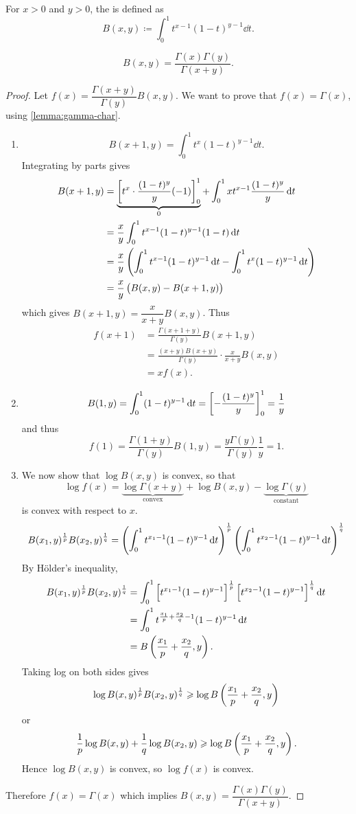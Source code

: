 \begin{definition}
For $x>0$ and $y>0$, the  is defined as
\[B(x,y)\coloneqq\int_0^1 t^{x-1}(1-t)^{y-1}\dd{t}.\]
\end{definition}

\begin{lemma}
\[B(x,y)=\frac{\Gamma(x)\Gamma(y)}{\Gamma(x+y)}.\]
\end{lemma}

\begin{proof}
Let $f(x)=\dfrac{\Gamma(x+y)}{\Gamma(y)}B(x,y)$. We want to prove that $f(x)=\Gamma(x)$, using \cref{lemma:gamma-char}.
\begin{enumerate}[label=(\roman*)]
\item \[B(x+1,y)=\int_0^1 t^x(1-t)^{y-1}\dd{t}.\]
Integrating by parts gives
\begin{align*}
B(x+1,y)&=\underbrace{\left[t^x\cdot\frac{(1-t)^y}{y}(-1)\right]_0^1}_{0}+\int_0^1 xt^{x-1}\frac{(1-t)^y}{y}\dd{t}\\
&=\frac{x}{y}\int_0^1 t^{x-1}(1-t)^{y-1}(1-t)\dd{t}\\
&=\frac{x}{y}\left(\int_0^1 t^{x-1}(1-t)^{y-1}\dd{t}-\int_0^1 t^x(1-t)^{y-1}\dd{t}\right)\\
&=\frac{x}{y}\left(B(x,y)-B(x+1,y)\right)
\end{align*}
which gives $B(x+1,y)=\dfrac{x}{x+y}B(x,y)$. Thus
\begin{align*}
f(x+1)&=\frac{\Gamma(x+1+y)}{\Gamma(y)}B(x+1,y)\\
&=\frac{(x+y)B(x+y)}{\Gamma(y)}\cdot\frac{x}{x+y}B(x,y)\\
&=xf(x).
\end{align*}
\item \[B(1,y)=\int_0^1(1-t)^{y-1}\dd{t}=\left[-\frac{(1-t)^y}{y}\right]_0^1=\frac{1}{y}\]
and thus
\[f(1)=\frac{\Gamma(1+y)}{\Gamma(y)}B(1,y)=\frac{y\Gamma(y)}{\Gamma(y)}\frac{1}{y}=1.\]
\item We now show that $\log B(x,y)$ is convex, so that
\[\log f(x)=\underbrace{\log\Gamma(x+y)}_\text{convex}+\log B(x,y)-\underbrace{\log\Gamma(y)}_\text{constant}\]
is convex with respect to $x$.
\[B(x_1,y)^\frac{1}{p}B(x_2,y)^\frac{1}{q}=\left(\int_0^1 t^{x_1-1}(1-t)^{y-1}\dd{t}\right)^\frac{1}{p}\left(\int_0^1 t^{x_2-1}(1-t)^{y-1}\dd{t}\right)^\frac{1}{q}\]
By H\"{o}lder's inequality,
\begin{align*}
B(x_1,y)^\frac{1}{p}B(x_2,y)^\frac{1}{q}
&=\int_0^1\left[t^{x_1-1}(1-t)^{y-1}\right]^\frac{1}{p}\left[t^{x_2-1}(1-t)^{y-1}\right]^\frac{1}{q}\dd{t}\\
&=\int_0^1 t^{\frac{x_1}{p}+\frac{x_2}{q}-1}(1-t)^{y-1}\dd{t}\\
&=B\left(\frac{x_1}{p}+\frac{x_2}{q},y\right).
\end{align*}
Taking log on both sides gives
\[\log B(x,y)^\frac{1}{p}B(x_2,y)^\frac{1}{q}\geqslant\log B\left(\frac{x_1}{p}+\frac{x_2}{q},y\right)\]
or
\[\frac{1}{p}\log B(x,y)+\frac{1}{q}\log B(x_2,y)\geqslant\log B\left(\frac{x_1}{p}+\frac{x_2}{q},y\right).\]
Hence $\log B(x,y)$ is convex, so $\log f(x)$ is convex.
\end{enumerate}
Therefore $f(x)=\Gamma(x)$ which implies $B(x,y)=\dfrac{\Gamma(x)\Gamma(y)}{\Gamma(x+y)}$.
\end{proof}

